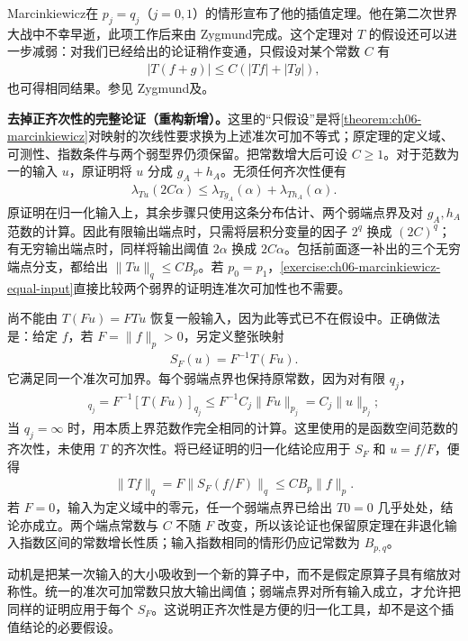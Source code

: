 \documentclass[../../main.tex]{subfiles}
\begin{document}
Marcinkiewicz\cite{folland-bib-97}在 $p_j=q_j$（$j=0,1$）的情形宣布了他的插值定理。他在第二次世界大战中不幸早逝，此项工作后来由 Zygmund\cite{folland-bib-166}完成。这个定理对 $T$ 的假设还可以进一步减弱：对我们已经给出的论证稍作变通，只假设对某个常数 $C$ 有
\begin{align*}
|T(f+g)|\leqslant C(|Tf|+|Tg|),
\end{align*}
也可得相同结果。参见 Zygmund\cite{folland-bib-166}及\cite[第XII.4节]{folland-bib-167}。
\begin{remark}
\textbf{去掉正齐次性的完整论证（重构新增）。}这里的“只假设”是将\cref{theorem:ch06-marcinkiewicz}对映射的次线性要求换为上述准次可加不等式；原定理的定义域、可测性、指数条件与两个弱型界仍须保留。把常数增大后可设 $C\geqslant1$。对于范数为一的输入 $u$，原证明将 $u$ 分成 $g_A+h_A$。无须任何齐次性便有
\begin{align*}
\lambda_{Tu}(2C\alpha)
\leqslant\lambda_{Tg_A}(\alpha)+\lambda_{Th_A}(\alpha).
\end{align*}
原证明在归一化输入上，其余步骤只使用这条分布估计、两个弱端点界及对 $g_A,h_A$ 范数的计算。因此有限输出端点时，只需将层积分变量的因子 $2^q$ 换成 $(2C)^q$；有无穷输出端点时，同样将输出阈值 $2\alpha$ 换成 $2C\alpha$。包括前面逐一补出的三个无穷端点分支，都给出 $\|Tu\|_q\leqslant C B_p$。若 $p_0=p_1$，\cref{exercise:ch06-marcinkiewicz-equal-input}直接比较两个弱界的证明连准次可加性也不需要。

尚不能由 $T(Fu)=FTu$ 恢复一般输入，因为此等式已不在假设中。正确做法是：给定 $f$，若 $F=\|f\|_p>0$，另定义整张映射
\begin{align*}
S_F(u)=F^{-1}T(Fu).
\end{align*}
它满足同一个准次可加界。每个弱端点界也保持原常数，因为对有限 $q_j$，
\begin{align*}
[S_F(u)]_{q_j}=F^{-1}[T(Fu)]_{q_j}
\leqslant F^{-1}C_j\|Fu\|_{p_j}=C_j\|u\|_{p_j};
\end{align*}
当 $q_j=\infty$ 时，用本质上界范数作完全相同的计算。这里使用的是函数空间范数的齐次性，未使用 $T$ 的齐次性。将已经证明的归一化结论应用于 $S_F$ 和 $u=f/F$，便得
\begin{align*}
\|Tf\|_q=F\|S_F(f/F)\|_q\leqslant C B_p\|f\|_p.
\end{align*}
若 $F=0$，输入为定义域中的零元，任一个弱端点界已给出 $T0=0$ 几乎处处，结论亦成立。两个端点常数与 $C$ 不随 $F$ 改变，所以该论证也保留原定理在非退化输入指数区间的常数增长性质；输入指数相同的情形仍应记常数为 $B_{p,q}$。

动机是把某一次输入的大小吸收到一个新的算子中，而不是假定原算子具有缩放对称性。统一的准次可加常数只放大输出阈值；弱端点界对所有输入成立，才允许把同样的证明应用于每个 $S_F$。这说明正齐次性是方便的归一化工具，却不是这个插值结论的必要假设。
\end{remark}
\end{document}
